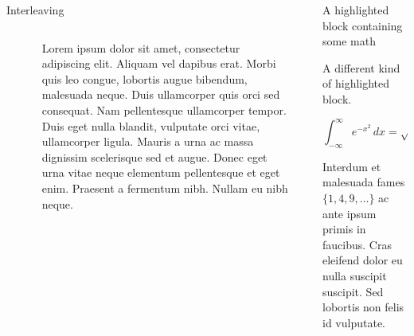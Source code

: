 \documentclass[final]{beamer}
\newlength{\sepwidth}
\newlength{\colwidth}
\newcommand{\separatorcolumn}{\begin{column}{\sepwidth}\end{column}}
\begin{document}
\begin{frame}[t]
\begin{columns}[t]
\begin{column}{\colwidth}
\begin{block}{Interleaving}
\vspace{1em}

\begin{columns}
\begin{column}{0.4\textwidth}
\begin{center}
      \begin{figure}
      \caption{Another figure caption.}
    \end{figure}
   \end{center}
\end{column}
\begin{column}{0.6\textwidth} 
\justify
Lorem ipsum dolor sit amet, consectetur adipiscing elit. Aliquam vel dapibus erat. Morbi quis leo congue, lobortis augue bibendum, malesuada neque. Duis ullamcorper quis orci sed consequat. Nam pellentesque ullamcorper tempor. Duis eget nulla blandit, vulputate orci vitae, ullamcorper ligula. Mauris a urna ac massa dignissim scelerisque sed et augue. Donec eget urna vitae neque elementum pellentesque et eget enim. Praesent a fermentum nibh. Nullam eu nibh neque. 
\end{column}
\end{columns}


  \end{block}



\end{column}

\separatorcolumn

\begin{column}{\colwidth}

  \begin{exampleblock}{A highlighted block containing some math}

    A different kind of highlighted block.

    $$
    \int_{-\infty}^{\infty} e^{-x^2}\,dx = \sqrt{\pi}
    $$

    Interdum et malesuada fames $\{1, 4, 9, \ldots\}$ ac ante ipsum primis in
    faucibus. Cras eleifend dolor eu nulla suscipit suscipit. Sed lobortis non
    felis id vulputate.


\end{exampleblock}
\end{column}
\end{columns}
\end{frame}
\end{document}
